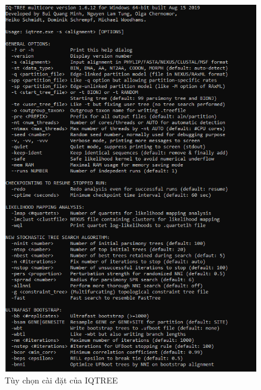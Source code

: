 \documentclass[12pt]{report}
\begin{document}
\begin{figure}[h]
	\centering
	\includegraphics[scale=0.8]{Image/4.7.png}
	\caption{Tùy chọn cài đặt của IQTREE }
	\label{fig:image4.7}
\end{figure}
\end{document}
